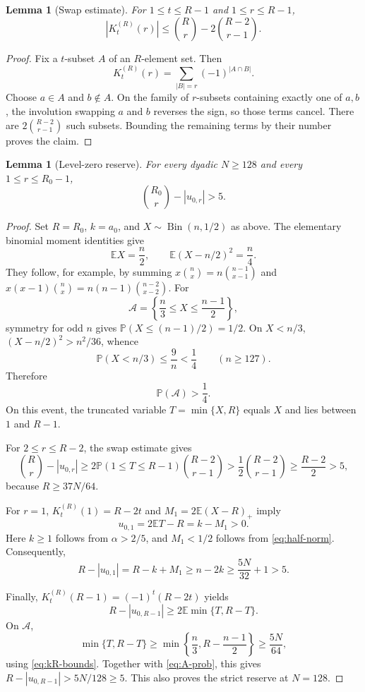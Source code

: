 \documentclass[11pt]{article}
\newtheorem{lemma}[theorem]{Lemma}
\theoremstyle{definition}
\theoremstyle{remark}
\newcommand{\E}{\mathbb E}
\newcommand{\Prb}{\mathbb P}
\begin{document}
\begin{lemma}[Swap estimate]\label{lem:swap}
For $1\le t\le R-1$ and $1\le r\le R-1$,
\begin{equation}\label{eq:swap-bound}
 \left|K_t^{(R)}(r)\right|
 \le\binom Rr-2\binom{R-2}{r-1}.
\end{equation}
\end{lemma}

\begin{proof}
Fix a $t$-subset $A$ of an $R$-element set.  Then
\[
 K_t^{(R)}(r)=\sum_{|B|=r}(-1)^{|A\cap B|}.
\]
Choose $a\in A$ and $b\notin A$.  On the family of $r$-subsets containing exactly one of $a,b$, the involution swapping $a$ and $b$ reverses the sign, so those terms cancel.  There are $2\binom{R-2}{r-1}$ such subsets.  Bounding the remaining terms by their number proves the claim.
\end{proof}

\begin{lemma}[Level-zero reserve]\label{lem:level-zero-reserve}
For every dyadic $N\ge128$ and every $1\le r\le R_0-1$,
\begin{equation}\label{eq:level-zero-slack}
 \binom{R_0}{r}-|u_{0,r}|>5.
\end{equation}
\end{lemma}
\begin{proof}
Set $R=R_0$, $k=a_0$, and $X\sim\operatorname{Bin}(n,1/2)$ as above.
The elementary binomial moment identities give
\[
 \E X=\frac n2,\qquad \E(X-n/2)^2=\frac n4.
\]
They follow, for example, by summing
$x\binom nx=n\binom{n-1}{x-1}$ and
$x(x-1)\binom nx=n(n-1)\binom{n-2}{x-2}$.
For
\[
 \mathcal A=\left\{\frac n3\le X\le\frac{n-1}{2}\right\},
\]
symmetry for odd $n$ gives $\Prb(X\le(n-1)/2)=1/2$. On $X<n/3$,
$(X-n/2)^2>n^2/36$, whence
\[
 \Prb(X<n/3)\le\frac{9}{n}<\frac14\qquad(n\ge127).
\]
Therefore
\begin{equation}\label{eq:A-prob}
 \Prb(\mathcal A)>\frac14.
\end{equation}
On this event, the truncated variable $T=\min\{X,R\}$ equals $X$ and
lies between $1$ and $R-1$.

For $2\le r\le R-2$, the swap estimate gives
\[
 \binom Rr-|u_{0,r}|
 \ge2\Prb(1\le T\le R-1)\binom{R-2}{r-1}
 >\frac12\binom{R-2}{r-1}\ge\frac{R-2}{2}>5,
\]
because $R\ge37N/64$.

For $r=1$, $K_t^{(R)}(1)=R-2t$ and
$M_1=2\E(X-R)_+$ imply
\[
 u_{0,1}=2\E T-R=k-M_1>0.
\]
Here $k\ge1$ follows from $\alpha>2/5$, and $M_1<1/2$ follows from
\eqref{eq:half-norm}. Consequently,
\[
 R-|u_{0,1}|=R-k+M_1\ge n-2k
 \ge\frac{5N}{32}+1>5.
\]

Finally, $K_t^{(R)}(R-1)=(-1)^t(R-2t)$ yields
\[
 R-|u_{0,R-1}|\ge2\E\min\{T,R-T\}.
\]
On $\mathcal A$,
\[
 \min\{T,R-T\}\ge
 \min\left\{\frac n3,R-\frac{n-1}{2}\right\}
 \ge\frac{5N}{64},
\]
using \eqref{eq:kR-bounds}. Together with \eqref{eq:A-prob}, this gives
$R-|u_{0,R-1}|>5N/128\ge5$. This also proves the strict reserve at
$N=128$.
\end{proof}
\end{document}
